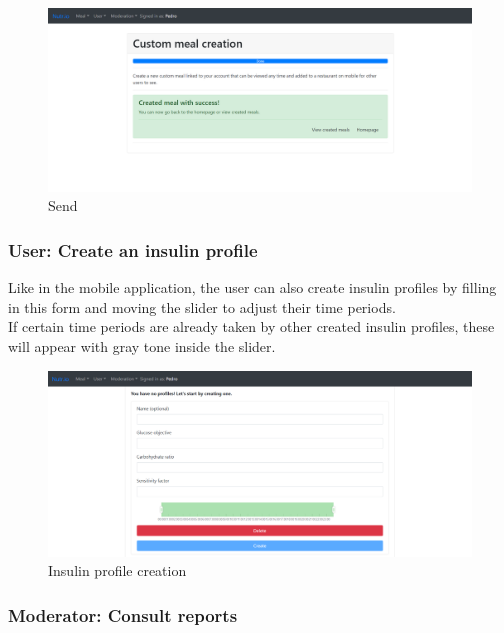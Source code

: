 \begin{figure}[H]
    \begin{center}
        \includegraphics[scale=0.4]{_figures/custom-5.png}
        \caption{Send}
    \end{center}
\end{figure}

\subsubsection{User: Create an insulin profile}

Like in the mobile application, the user can also create insulin profiles by filling in this form 
and moving the slider to adjust their time periods.\\

If certain time periods are already taken by other created insulin profiles, these will appear with
gray tone inside the slider.\\

\begin{figure}[H]
    \begin{center}
        \includegraphics[scale=0.4]{_figures/web-insulin-profile-creation.png}
        \caption{Insulin profile creation}
    \end{center}
\end{figure}

\subsubsection{Moderator: Consult reports}

